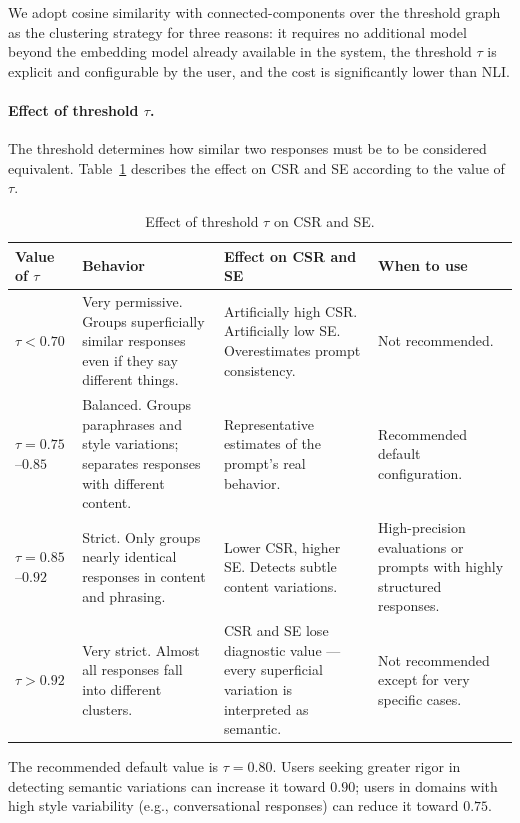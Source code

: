 \documentclass[11pt,a4paper]{article}
\begin{document}
We adopt cosine similarity with connected-components over the threshold graph as the clustering strategy for three reasons: it requires no additional model beyond the embedding model already available in the system, the threshold $\tau$ is explicit and configurable by the user, and the cost is significantly lower than NLI.

\paragraph{Effect of threshold $\tau$.}
The threshold determines how similar two responses must be to be considered equivalent. Table~\ref{tab:tau} describes the effect on CSR and SE according to the value of $\tau$.

\begin{table}[h]
\centering
\caption{Effect of threshold $\tau$ on CSR and SE.}
\label{tab:tau}
\begin{tabular}{p{2cm} p{3.5cm} p{3.5cm} p{3.5cm}}
\toprule
Value of $\tau$ & Behavior & Effect on CSR and SE & When to use \\
\midrule
$\tau < 0.70$ &
Very permissive. Groups superficially similar responses even if they say different things. &
Artificially high CSR. Artificially low SE. Overestimates prompt consistency. &
Not recommended. \\
\addlinespace
$\tau = 0.75$--$0.85$ &
Balanced. Groups paraphrases and style variations; separates responses with different content. &
Representative estimates of the prompt's real behavior. &
Recommended default configuration. \\
\addlinespace
$\tau = 0.85$--$0.92$ &
Strict. Only groups nearly identical responses in content and phrasing. &
Lower CSR, higher SE. Detects subtle content variations. &
High-precision evaluations or prompts with highly structured responses. \\
\addlinespace
$\tau > 0.92$ &
Very strict. Almost all responses fall into different clusters. &
CSR and SE lose diagnostic value — every superficial variation is interpreted as semantic. &
Not recommended except for very specific cases. \\
\bottomrule
\end{tabular}
\end{table}

\noindent The recommended default value is $\tau = 0.80$. Users seeking greater rigor in detecting semantic variations can increase it toward $0.90$; users in domains with high style variability (e.g., conversational responses) can reduce it toward $0.75$.
\end{document}
